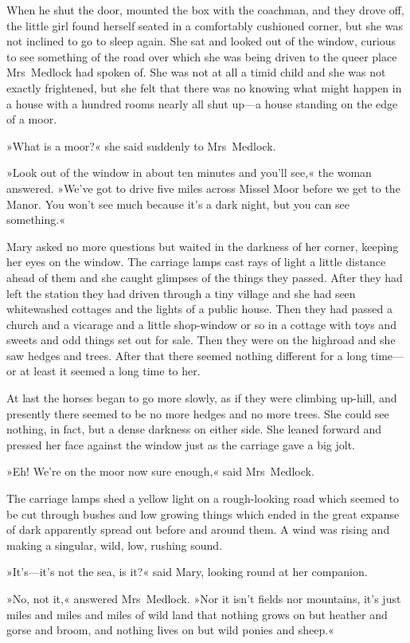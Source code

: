 When he shut the door, mounted the box with the coachman, and they drove off, the little girl found herself seated in a comfortably cushioned corner, but she was not inclined to go to sleep again. She sat and looked out of the window, curious to see something of the road over which she was being driven to the queer place Mrs~Medlock had spoken of. She was not at all a timid child and she was not exactly frightened, but she felt that there was no knowing what might happen in a house with a hundred rooms nearly all shut up—a house standing on the edge of a moor.

»What is a moor?« she said suddenly to Mrs~Medlock.

»Look out of the window in about ten minutes and you'll see,« the woman answered. »We've got to drive five miles across Missel Moor before we get to the Manor. You won't see much because it's a dark night, but you can see something.«

Mary asked no more questions but waited in the darkness of her corner, keeping her eyes on the window. The carriage lamps cast rays of light a little distance ahead of them and she caught glimpses of the things they passed. After they had left the station they had driven through a tiny village and she had seen whitewashed cottages and the lights of a public house. Then they had passed a church and a vicarage and a little shop-window or so in a cottage with toys and sweets and odd things set out for sale. Then they were on the highroad and she saw hedges and trees. After that there seemed nothing different for a long time—or at least it seemed a long time to her.

At last the horses began to go more slowly, as if they were climbing up-hill, and presently there seemed to be no more hedges and no more trees. She could see nothing, in fact, but a dense darkness on either side. She leaned forward and pressed her face against the window just as the carriage gave a big jolt.

»Eh! We're on the moor now sure enough,« said Mrs~Medlock.

The carriage lamps shed a yellow light on a rough-looking road which seemed to be cut through bushes and low growing things which ended in the great expanse of dark apparently spread out before and around them. A wind was rising and making a singular, wild, low, rushing sound.

»It's—it's not the sea, is it?« said Mary, looking round at her companion.

»No, not it,« answered Mrs~Medlock. »Nor it isn't fields nor mountains, it's just miles and miles and miles of wild land that nothing grows on but heather and gorse and broom, and nothing lives on but wild ponies and sheep.«

